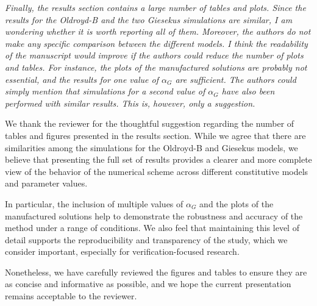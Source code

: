 \documentclass[12pt]{article}
\begin{document}
{\it Finally, the results section contains a large number of tables and plots. Since the results for the Oldroyd-B and the two Giesekus simulations are similar, I am wondering whether it is worth reporting all of them. Moreover, the authors do not make any specific comparison between the different models. I think the readability of the manuscript would improve if the authors could reduce the number of plots and tables. For instance, the plots of the manufactured solutions are probably not essential, and the results for one value of $\alpha_G$ are sufficient. The authors could simply mention that simulations for a second value of $\alpha_G$ have also been performed with similar results. This is, however, only a suggestion.} 

\vspace{3mm}
We thank the reviewer for the thoughtful suggestion regarding the number of tables and figures presented in the results section. While we agree that there are similarities among the simulations for the Oldroyd-B and Giesekus models, we believe that presenting the full set of results provides a clearer and more complete view of the behavior of the numerical scheme across different constitutive models and parameter values.

In particular, the inclusion of multiple values of $\alpha_G$ and the plots of the manufactured solutions help to demonstrate the robustness and accuracy of the method under a range of conditions. We also feel that maintaining this level of detail supports the reproducibility and transparency of the study, which we consider important, especially for verification-focused research.

Nonetheless, we have carefully reviewed the figures and tables to ensure they are as concise and informative as possible, and we hope the current presentation remains acceptable to the reviewer.
\vspace{3mm}
\end{document}
